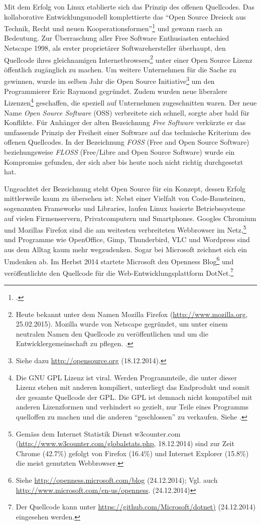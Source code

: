 \documentclass[
paper=164mm:234mm, %
pagesize, %
DIV=calc, %
10pt, %
BCOR=0mm, %
parskip=half- %
]{scrbook}
\begin{document}
Mit dem Erfolg von Linux etablierte sich das Prinzip des offenen Quellcodes. Das kollaborative Entwicklungsmodell komplettierte das \enquote{Open Source Dreieck aus Technik, Recht und neuen Kooperationsformen}\footnote{\cite{Deterding:2007}.} und gewann rasch an Bedeutung. Zur Überraschung aller Free Software Enthusiasten entschied Netscape 1998, als erster proprietärer Softwarehersteller überhaupt, den Quellcode ihres gleichnamigen Internetbrowsers\footnote{Heute bekannt unter dem Namen Mozilla Firefox (\url{http://www.mozilla.org}, 25.02.2015). Mozilla wurde von Netscape gegründet, um unter einem neutralen Namen den Quellcode zu veröffentlichen und um die Entwicklergemeinschaft zu pflegen. \cite[91]{Hamerly-Paquin-Walton:1999}.} unter einer Open Source Lizenz öffentlich zugänglich zu machen. Um weitere Unternehmen für die Sache zu gewinnen, wurde im selben Jahr die Open Source Initiative\footnote{Siehe dazu \url{http://opensource.org} (18.12.2014).} um den Programmierer Eric Raymond gegründet. Zudem wurden neue liberalere Lizenzen\footnote{Die GNU GPL Lizenz ist viral. Werden Programmteile, die unter dieser Lizenz stehen mit anderen kompiliert, unterliegt das Endprodukt und somit der gesamte Quellcode der GPL. Die GPL ist demnach nicht kompatibel mit anderen Lizenzformen und verhindert so gezielt, nur Teile eines Programms quelloffen zu machen und die anderen \enquote{geschlossen} zu verkaufen. Siehe \cite[93]{Hamerly-Paquin-Walton:1999}.} geschaffen, die speziell auf Unternehmen zugeschnitten waren. Der neue Name \emph{Open Source Software} (OSS) verbreitete sich schnell, sorgte aber bald für Konflikte. Für Anhänger der alten Bezeichnung \emph{Free Software} verkürzte er das umfassende Prinzip der Freiheit einer Software auf das technische Kriterium des offenen Quellcodes. In der Bezeichnung \emph{FOSS} (Free and Open Source Software) beziehungsweise \emph{FLOSS} (Free/Libre and Open Source Software) wurde ein Kompromiss gefunden, der sich aber bis heute noch nicht richtig durchgesetzt hat.

Ungeachtet der Bezeichnung steht Open Source für ein Konzept, dessen Erfolg mittlerweile kaum zu übersehen ist: Nebst einer Vielfalt von Code-Bausteinen, sogenannten Frameworks und Libraries, laufen Linux basierte Betriebssysteme auf vielen Firmenservern, Privatcomputern und Smartphones. Googles Chromium und Mozillas Firefox sind die am weitesten verbreiteten Webbrowser im Netz,\footnote{Gemäss dem Internet Statistik Dienst w3counter.com (\url{http://www.w3counter.com/globalstats.php}, 18.12.2014) sind zur Zeit Chrome (42.7\%) gefolgt von Firefox (16.4\%) und Internet Explorer (15.8\%) die meist genutzten Webbrowser.} und Programme wie OpenOffice, Gimp, Thunderbird, VLC und Wordpress sind aus dem Alltag kaum mehr wegzudenken. Sogar bei Microsoft zeichnet sich ein Umdenken ab. Im Herbst 2014 startete Microsoft den Openness Blog\footnote{Siehe \url{http://openness.microsoft.com/blog} (24.12.2014); Vgl. auch \url{http://www.microsoft.com/en-us/openness}. (24.12.2014)} und veröffentlichte den Quellcode für die Web-Entwicklungsplattform DotNet.\footnote{Der Quellcode kann unter \url{https://github.com/Microsoft/dotnet)} (24.12.2014) eingesehen werden.}
\end{document}

